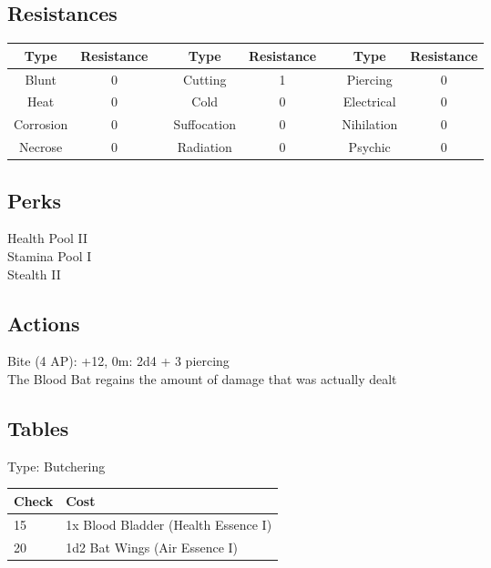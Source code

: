 \subsection{Resistances}
\begin{minipage}[H]{1\textwidth}
	\centering
	\begin{tabular}[c]{|c | c | c | c | c | c | c | c|}
		\hline
		Type & Resistance && Type & Resistance && Type & Resistance\\
		\hline
		Blunt & 0 &&
		Cutting & 1 &&
		Piercing & 0\\
		Heat & 0 &&
		Cold & 0 &&
		Electrical & 0\\
		Corrosion & 0 &&
		Suffocation & 0 &&
		Nihilation & 0 \\
		Necrose & 0 &&
		Radiation & 0 &&
		Psychic & 0\\
		\hline
	\end{tabular}
\end{minipage}

\subsection{Perks}
Health Pool II\\
Stamina Pool I\\
Stealth II\\

\subsection{Actions}
Bite (4 AP): +12, 0m: 2d4 + 3 piercing\\
The Blood Bat regains the amount of damage that was actually dealt

\subsection{Tables}
Type: Butchering
\\
\begin{minipage}{0.8\textwidth}
	\begin{tabular}{|l | l|}
		\hline
		Check & Cost\\
		\hline
		15 & 1x Blood Bladder (Health Essence I)\\
		20 & 1d2 Bat Wings (Air Essence I)\\
		\hline
	\end{tabular}
\end{minipage}
\pagebreak